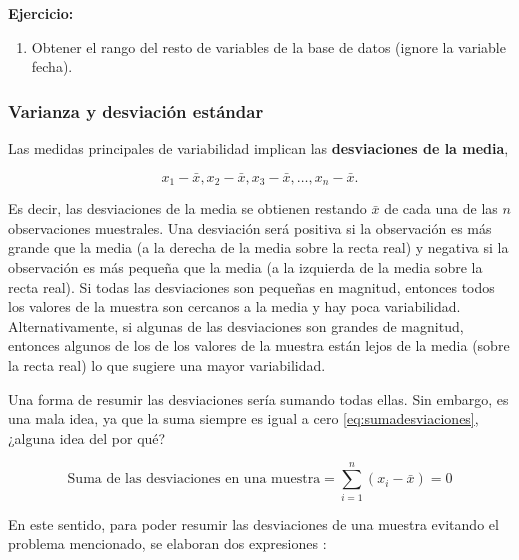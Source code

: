 \documentclass[
]{book}
\providecommand{\tightlist}{%
  \setlength{\itemsep}{0pt}\setlength{\parskip}{0pt}}
\begin{document}
\textbf{Ejercicio:}

\begin{enumerate}
\def\labelenumi{\arabic{enumi}.}
\tightlist
\item
  Obtener el rango del resto de variables de la base de datos (ignore la variable fecha).
\end{enumerate}

\hypertarget{varianza-y-desviaciuxf3n-estuxe1ndar}{%
\subsubsection*{Varianza y desviación estándar}\label{varianza-y-desviaciuxf3n-estuxe1ndar}}

Las medidas principales de variabilidad implican las \textbf{desviaciones de la media},

\begin{equation}
x_1 - \bar{x}, x_2 - \bar{x}, x_3 - \bar{x}, \ldots, x_n - \bar{x}.
\label{eq:desviaciones}
\end{equation}

Es decir, las desviaciones de la media se obtienen restando \(\bar{x}\) de cada una de las \(n\) observaciones muestrales. Una desviación será positiva si la observación es más grande que la media (a la derecha de la media sobre la recta real) y negativa si la observación es más pequeña que la media (a la izquierda de la media sobre la recta real). Si todas las desviaciones son pequeñas en magnitud, entonces todos los valores de la muestra son cercanos a la media y hay poca variabilidad. Alternativamente, si algunas de las desviaciones son grandes de magnitud, entonces algunos de los de los valores de la muestra están lejos de la media (sobre la recta real) lo que sugiere una mayor variabilidad.

Una forma de resumir las desviaciones sería sumando todas ellas. Sin embargo, es una mala idea, ya que la suma siempre es igual a cero \eqref{eq:sumadesviaciones}, ¿alguna idea del por qué?

\begin{equation}
\text{Suma de las desviaciones en una muestra} = \sum_{i=1}^{n}(x_i-\bar{x}) = 0
\label{eq:sumadesviaciones}
\end{equation}

En este sentido, para poder resumir las desviaciones de una muestra evitando el problema mencionado, se elaboran dos expresiones \citep[página 32]{Devore}:
\end{document}
